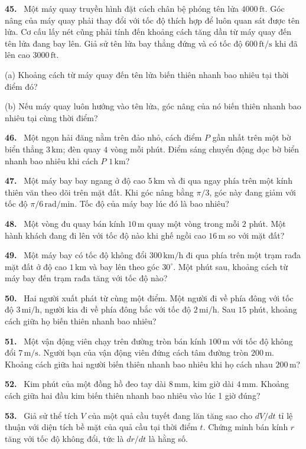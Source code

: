 \documentclass[12pt,a4paper]{article}
\newcommand{\bt}[1]{\par\smallskip\Needspace{5\baselineskip}\noindent\textbf{#1.}\ }
\begin{document}
\bt{45} Một máy quay truyền hình đặt cách chân bệ phóng tên lửa $4000\,\mathrm{ft}$. Góc nâng của máy quay phải thay đổi với tốc độ thích hợp để luôn quan sát được tên lửa. Cơ cấu lấy nét cũng phải tính đến khoảng cách tăng dần từ máy quay đến tên lửa đang bay lên. Giả sử tên lửa bay thẳng đứng và có tốc độ $600\,\mathrm{ft/s}$ khi đã lên cao $3000\,\mathrm{ft}$.

(a) Khoảng cách từ máy quay đến tên lửa biến thiên nhanh bao nhiêu tại thời điểm đó?

(b) Nếu máy quay luôn hướng vào tên lửa, góc nâng của nó biến thiên nhanh bao nhiêu tại cùng thời điểm?

\bt{46} Một ngọn hải đăng nằm trên đảo nhỏ, cách điểm $P$ gần nhất trên một bờ biển thẳng $3\,\mathrm{km}$; đèn quay $4$ vòng mỗi phút. Điểm sáng chuyển động dọc bờ biển nhanh bao nhiêu khi cách $P$ $1\,\mathrm{km}$?

\bt{47} Một máy bay bay ngang ở độ cao $5\,\mathrm{km}$ và đi qua ngay phía trên một kính thiên văn theo dõi trên mặt đất. Khi góc nâng bằng $\pi/3$, góc này đang giảm với tốc độ $\pi/6\,\mathrm{rad/min}$. Tốc độ của máy bay lúc đó là bao nhiêu?

\bt{48} Một vòng đu quay bán kính $10\,\mathrm{m}$ quay một vòng trong mỗi $2$ phút. Một hành khách đang đi lên với tốc độ nào khi ghế ngồi cao $16\,\mathrm{m}$ so với mặt đất?

\bt{49} Một máy bay có tốc độ không đổi $300\,\mathrm{km/h}$ đi qua phía trên một trạm rađa mặt đất ở độ cao $1\,\mathrm{km}$ và bay lên theo góc $30^\circ$. Một phút sau, khoảng cách từ máy bay đến trạm rađa tăng với tốc độ nào?

\bt{50} Hai người xuất phát từ cùng một điểm. Một người đi về phía đông với tốc độ $3\,\mathrm{mi/h}$, người kia đi về phía đông bắc với tốc độ $2\,\mathrm{mi/h}$. Sau $15$ phút, khoảng cách giữa họ biến thiên nhanh bao nhiêu?

\bt{51} Một vận động viên chạy trên đường tròn bán kính $100\,\mathrm{m}$ với tốc độ không đổi $7\,\mathrm{m/s}$. Người bạn của vận động viên đứng cách tâm đường tròn $200\,\mathrm{m}$. Khoảng cách giữa hai người biến thiên nhanh bao nhiêu khi họ cách nhau $200\,\mathrm{m}$?

\bt{52} Kim phút của một đồng hồ đeo tay dài $8\,\mathrm{mm}$, kim giờ dài $4\,\mathrm{mm}$. Khoảng cách giữa hai đầu kim biến thiên nhanh bao nhiêu vào lúc 1 giờ đúng?

\bt{53} Giả sử thể tích $V$ của một quả cầu tuyết đang lăn tăng sao cho $dV/dt$ tỉ lệ thuận với diện tích bề mặt của quả cầu tại thời điểm $t$. Chứng minh bán kính $r$ tăng với tốc độ không đổi, tức là $dr/dt$ là hằng số.
\end{document}
